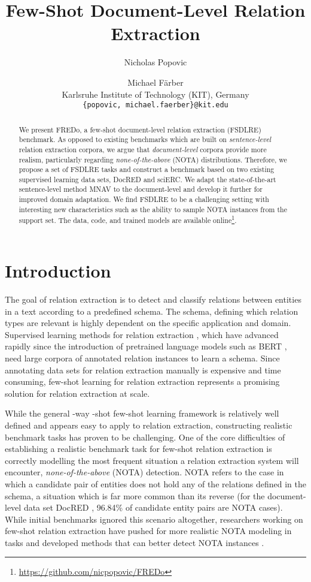 \documentclass[11pt]{article}
\title{Few-Shot Document-Level Relation Extraction}
\author{Nicholas Popovic \and Michael Färber\\
  Karlsruhe Institute of Technology (KIT), Germany \\
  \texttt{\{popovic, michael.faerber\}@kit.edu} \\}
\begin{document}
\maketitle
\begin{abstract}
We present FREDo, a few-shot document-level relation extraction (FSDLRE) benchmark.
As opposed to existing benchmarks which are built on \textit{sentence-level} relation extraction corpora, we argue that \textit{document-level} corpora provide more realism, particularly regarding \textit{none-of-the-above} (NOTA) distributions.
Therefore, we propose a set of FSDLRE tasks and construct a benchmark based on two existing supervised learning data sets, DocRED and sciERC.
We adapt the state-of-the-art sentence-level method MNAV to the document-level and develop it further for improved domain adaptation.
We find FSDLRE to be a challenging setting with interesting new characteristics such as the ability to sample NOTA instances from the support set.
The data, code, and trained models are available online\footnote{\url{https://github.com/nicpopovic/FREDo}}.

\end{abstract}


\section{Introduction}

The goal of relation extraction is to detect and classify relations between entities in a text according to a predefined schema.
The schema, defining which relation types are relevant is highly dependent on the specific application and domain.
Supervised learning methods for relation extraction \cite{soares_matching_2019,zhou_document-level_2020,zhang_document-level_2021,xu_entity_2021,xiao_sais_2021}, which have advanced rapidly since the introduction of pretrained language models such as BERT \cite{devlin_bert_2019}, need large corpora of annotated relation instances to learn a schema.
Since annotating data sets for relation extraction manually is expensive and time consuming, few-shot learning for relation extraction represents a promising solution for relation extraction at scale. 

While the general -way -shot few-shot learning framework is relatively well defined and appears easy to apply to relation extraction, constructing realistic benchmark tasks has proven to be challenging. 
One of the core difficulties of establishing a realistic benchmark task for few-shot relation extraction is correctly modelling the most frequent situation a relation extraction system will encounter, \textit{none-of-the-above} (NOTA) detection.
NOTA refers to the case in which a candidate pair of entities does not hold any of the relations defined in the schema, a situation which is far more common than its reverse (for the document-level data set DocRED \cite{yao_docred_2019}, 96.84\% of candidate entity pairs are NOTA cases).
While initial benchmarks \cite{han_fewrel_2018} ignored this scenario altogether, researchers working on few-shot relation extraction have pushed for more realistic NOTA modeling in tasks and developed methods that can better detect NOTA instances \cite{gao_fewrel_2019,sabo_revisiting_2021}.
\end{document}
